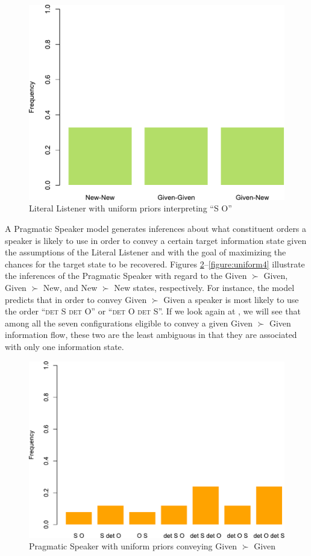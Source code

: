 \documentclass[output=paper,modfonts,nonflat]{langsci/langscibook}
\begin{document}
\begin{figure}
\includegraphics[width=.666\textwidth]{figures/plotLiteralListenerSbjObjUniform}
\caption{Literal Listener with uniform priors interpreting  ``S O''}\label{figure:uniform1}
\end{figure}

A Pragmatic Speaker model generates inferences about what constituent orders a speaker is likely to use in order to convey a certain target information state given the assumptions of the Literal Listener and with the goal of maximizing the chances for the target state to be recovered. Figures \ref{figure:uniform2}--\ref{figure:uniform4} illustrate the inferences of the Pragmatic Speaker with regard to the Given $\succ$ Given, Given $\succ$ New, and New $\succ$ New states, respectively. For instance, the model predicts that in order to convey Given $\succ$ Given a speaker is most likely to use the order  ``{\scshape det} S {\scshape det} O'' or  ``{\scshape det} O {\scshape det} S''. If we look again at , we will see that among all the seven configurations eligible to convey a given Given $\succ$ Given information flow, these two are the least ambiguous in that they are associated with only one information state.

\begin{figure}
\includegraphics[width=.666\textwidth]{figures/plotPragmaticSpeakerGivenGivenUniform}
\caption{\small Pragmatic Speaker with uniform priors conveying Given $\succ$ Given}\label{figure:uniform2}
\end{figure}
\end{document}

